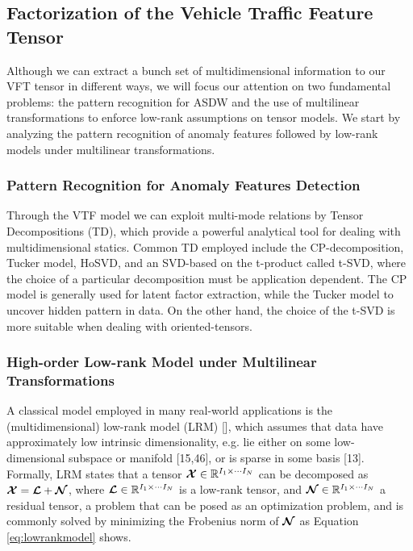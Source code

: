 \documentclass[sensors,article,submit,moreauthors,pdftex]{Definitions/mdpi}
\newcommand{\mathten}[1]{\boldsymbol{\mathbf{\mathcal{\MakeUppercase{#1}}}}}
\begin{document}
\subsection{Factorization of the Vehicle Traffic Feature Tensor}
Although we can extract a bunch set of multidimensional information to our VFT tensor in different ways, we will focus our attention on two fundamental problems: the pattern recognition for ASDW and the use of multilinear transformations to enforce low-rank assumptions on tensor models. We start by analyzing the pattern recognition of anomaly features followed by low-rank models under multilinear transformations.

\subsubsection{Pattern Recognition for Anomaly Features Detection}
Through the VTF model we can exploit multi-mode relations by Tensor Decompositions (TD), which provide a powerful analytical tool for dealing with multidimensional statics. Common TD employed include the CP-decomposition, Tucker model, HoSVD, and an SVD-based on the t-product called t-SVD, where the choice of a particular decomposition must be application dependent. The CP model is generally used for latent factor extraction, while the Tucker model to uncover hidden pattern in data. On the other hand, the choice of the t-SVD is more suitable when dealing with oriented-tensors.

\subsubsection{High-order Low-rank Model under Multilinear Transformations}

A classical model employed in many real-world applications is the (multidimensional) low-rank model (LRM) [], which assumes that data have approximately low intrinsic dimensionality, e.g. lie either on some low-dimensional subspace or manifold [15,46], or is sparse in some basis [13]. Formally, LRM states that a tensor $\mathten{X}\in\mathbb{R}^{I_1\times \cdots I_N}$ can be decomposed as $\mathten{X} = \mathten{L} + \mathten{N}$, where $\mathten{L}\in\mathbb{R}^{I_1\times \cdots I_N}$ is a low-rank tensor, and $\mathten{N}\in\mathbb{R}^{I_1\times \cdots I_N}$ a residual tensor, a problem that can be posed as an optimization problem, and is commonly solved by minimizing the Frobenius norm of $\mathten{N}$ as Equation \ref{eq:lowrankmodel} shows.
\end{document}
